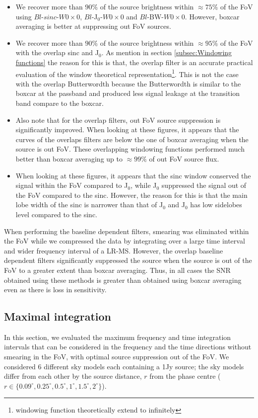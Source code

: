 \documentclass[useAMS,usenatbib]{mn2e}
\begin{document}
\begin{itemize}
 \item We recover more than $90\%$ of the source brightness within $\approx 75\%$ of the FoV using $Bl$-$sinc$-$W0 \times 0$, 
      $Bl$-J$_0$-$W0\times0$ and $Bl$-BW-$W0\times0$. However, boxcar averaging is better at suppressing out FoV sources. 
 \item We recover more than $90\%$ of the source brightness within $\approx 95\%$ of the FoV with the overlap sinc and J$_0$. As 
mention in section \ref{subsec:Windowing functions} the reason for this is that, the overlap filter is an accurate practical evaluation of 
the window theoretical representation\footnote{windowing function theoretically extend to infinitely}. This is not the case with the 
overlap Butterwordth because the Butterwordth is similar to the boxcar at the passband and produced less signal leakage at the 
transition band compare to the boxcar. 
 \item Also note that for the overlap filters, out FoV source suppression is significantly improved.  When
looking at these figures, it appears that the curves of the overlaps filters are below the one of boxcar averaging when the source is out 
FoV. These overlapping windowing functions performed much better than boxcar averaging up to  $\approx 99\%$ of out FoV source flux.
  \item  When
looking at these figures, it appears that the sinc window conserved the signal within the FoV compared to J$_0$, while J$_0$ suppressed the 
signal out of the FoV compared to the sinc. However, the reason for 
this is that
the main lobe width of the sinc is narrower than that of J$_0$ and J$_0$ has low 
sidelobes level compared to the sinc.
\end{itemize}
When performing the baseline dependent filters, smearing was eliminated within the FoV while we compressed 
the data by integrating over a large time interval and wider frequency interval of a LR-MS. However,
the overlap baseline dependent filters significantly suppressed the source  when the source is out of the FoV  to a greater extent than 
boxcar averaging. Thus,
in all cases the SNR obtained using these methods is greater than obtained using boxcar averaging even as there is loss in 
sensitivity.
\subsection{Maximal integration}
In this section, we evaluated the maximum frequency and time integration intervals  that can be 
considered in the frequency and the time 
directions without smearing in the FoV, with optimal source suppression out of the FoV. We considered $6$ different sky 
models each  containing a 1Jy source; the sky models differ from each other by the source distance, $r$ from the phase centre
($r\in\{0.09^\circ,0.25^\circ,0.5^\circ,1^\circ,1.5^\circ, 2^\circ\}$).
\end{document}
